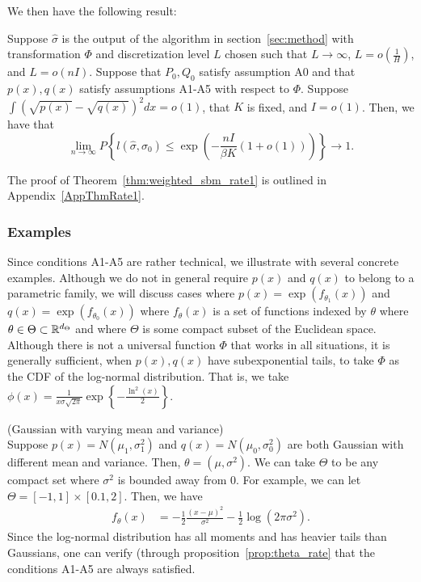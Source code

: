 We then have the following result:
\begin{theorem}
\label{thm:weighted_sbm_rate1}
Suppose $\hat{\sigma}$ is the output of the algorithm in section~\ref{sec:method} with transformation $\Phi$ and discretization level $L$ chosen such that $L \rightarrow \infty$, $L = o(\frac{1}{H})$, and $L = o(nI)$. Suppose that $P_0, Q_0$ satisfy assumption A0 and that $p(x), q(x)$ satisfy assumptions A1-A5 with respect to $\Phi$. Suppose $\int (\sqrt{p(x)} - \sqrt{q(x)})^2 dx = o(1)$, that $K$ is fixed, and $I = o(1)$. Then, we have that
\[
\lim_{n \rightarrow \infty} P \left\{
     l(\hat{\sigma}, \sigma_0) \leq \exp\left( - \frac{nI}{\beta K} (1 + o(1)) \right)
    \right\} \rightarrow 1.
\]
\end{theorem}
The proof of Theorem~\ref{thm:weighted_sbm_rate1} is outlined in Appendix~\ref{AppThmRate1}. 

\subsubsection{Examples}
\label{SubsecExa}

Since conditions A1-A5 are rather technical, we illustrate with several concrete examples. Although we do not in general require $p(x)$ and $q(x)$ to belong to a parametric family, we will discuss cases where $p(x) = \exp( f_{\theta_1}(x))$ and $q(x) = \exp( f_{\theta_0}(x))$ where $f_{\theta}(x)$ is a set of functions indexed by $\theta$ where  $\theta \in \Theta \subset {\mathbb R}^{d_{\Theta}}$ and where $\Theta$ is some compact subset of the Euclidean space.
Although there is not a universal function $\Phi$ that works in all situations, it is generally sufficient, when $p(x), q(x)$ have subexponential tails, to take $\Phi$ as the CDF of the log-normal distribution. That is, we take $\phi(x) = \frac{1}{x \sigma \sqrt{2\pi}} \exp\left\{ - \frac{\ln^2 (x)}{2} \right\}$.

\begin{example} (Gaussian with varying mean and variance)\\
Suppose $p(x) = N(\mu_1, \sigma_1^2)$ and $q(x) = N(\mu_0, \sigma_0^2)$ are both Gaussian with different mean and variance. Then, $\theta = (\mu, \sigma^2)$. We can take $\Theta$ to be any compact set where $\sigma^2$ is bounded away from 0. For example, we can let $\Theta = [-1,1] \times [0.1, 2]$. Then, we have
\begin{align*}
f_\theta(x) &= - \frac{1}{2} \frac{(x - \mu)^2 }{\sigma^2} - \frac{1}{2} \log (2\pi \sigma^2 ).
\end{align*}
Since the log-normal distribution has all moments and has heavier tails than Gaussians, one can verify (through proposition~\ref{prop:theta_rate} that the conditions A1-A5 are always satisfied.
\end{example}

